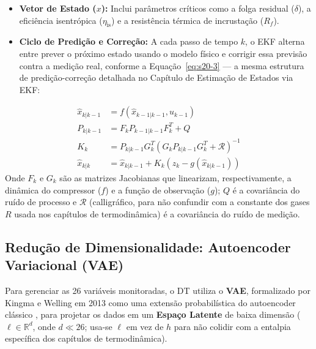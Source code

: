 \documentclass[12pt,a4paper]{article}
\numberwithin{equation}{section}
\numberwithin{table}{section}
\numberwithin{figure}{section}
\begin{document}
{	\begin{itemize}
		\item \textbf{Vetor de Estado ($x$):} Inclui parâmetros críticos como a folga residual ($\delta$), a eficiência isentrópica ($\eta_{\text{is}}$) e a resistência térmica de incrustação ($R_f$).
		\item \textbf{Ciclo de Predição e Correção:} A cada passo de tempo $k$, o EKF alterna entre prever o próximo estado usando o modelo físico e corrigir essa previsão contra a medição real, conforme a Equação~\eqref{eq:s20-3} — a mesma estrutura de predição-correção detalhada no Capítulo de Estimação de Estados via EKF:
	\end{itemize}
	\begin{equation}\label{eq:s20-3}
	\begin{aligned}
		\hat{x}_{k|k-1} &= f(\hat{x}_{k-1|k-1}, u_{k-1}) \\[4pt]
		P_{k|k-1} &= F_k P_{k-1|k-1} F_k^T + Q \\[4pt]
		K_k &= P_{k|k-1} G_k^T (G_k P_{k|k-1} G_k^T + \mathcal{R})^{-1} \\[4pt]
		\hat{x}_{k|k} &= \hat{x}_{k|k-1} + K_k (z_k - g(\hat{x}_{k|k-1}))
	\end{aligned}
\end{equation}
	Onde $F_k$ e $G_k$ são as matrizes Jacobianas que linearizam, respectivamente, a dinâmica do compressor ($f$) e a função de observação ($g$); $Q$ é a covariância do ruído de processo e $\mathcal{R}$ (calligráfico, para não confundir com a constante dos gases $R$ usada nos capítulos de termodinâmica) é a covariância do ruído de medição.

	\subsection{Redução de Dimensionalidade: Autoencoder Variacional (VAE)}

	Para gerenciar as 26 variáveis monitoradas, o DT utiliza o \textbf{VAE}, formalizado por Kingma e Welling em 2013 como uma extensão probabilística do autoencoder clássico \cite{vae}, para projetar os dados em um \textbf{Espaço Latente} de baixa dimensão ($\ell \in \mathbb{R}^d$, onde $d \ll 26$; usa-se $\ell$ em vez de $h$ para não colidir com a entalpia específica dos capítulos de termodinâmica).
	
}
\end{document}
